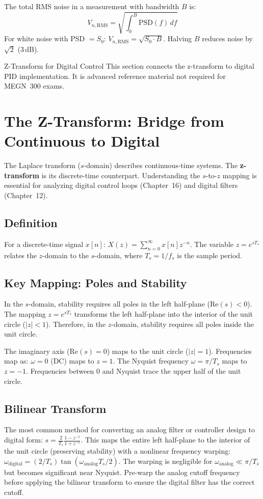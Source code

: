 \documentclass[11pt,letterpaper,twoside,openany]{book}
\begin{document}
The total RMS noise in a measurement with bandwidth $B$ is:
\begin{equation}
V_{n,\text{RMS}} = \sqrt{\int_0^B \text{PSD}(f)\,df}
\end{equation}
For white noise with PSD $= S_0$: $V_{n,\text{RMS}} = \sqrt{S_0 \cdot B}$. Halving $B$ reduces noise by $\sqrt{2}$ (3\,dB).
\begin{advancedbox}{Z-Transform for Digital Control}
This section connects the z-transform to digital PID implementation. It is advanced reference material not required for MEGN~300 exams.
\end{advancedbox}
\section{The Z-Transform: Bridge from Continuous to Digital}
The Laplace transform ($s$-domain) describes continuous-time systems. The \textbf{z-transform} is its discrete-time counterpart. Understanding the $s$-to-$z$ mapping is essential for analyzing digital control loops (Chapter~16) and digital filters (Chapter~12).

\subsection{Definition}
For a discrete-time signal $x[n]$: $X(z) = \sum_{n=0}^{\infty} x[n] z^{-n}$. The variable $z = e^{sT_s}$ relates the $z$-domain to the $s$-domain, where $T_s = 1/f_s$ is the sample period.

\subsection{Key Mapping: Poles and Stability}
In the $s$-domain, stability requires all poles in the left half-plane ($\text{Re}(s) < 0$). The mapping $z = e^{sT_s}$ transforms the left half-plane into the interior of the unit circle ($|z| < 1$). Therefore, in the $z$-domain, stability requires all poles inside the unit circle.

The imaginary axis ($\text{Re}(s) = 0$) maps to the unit circle ($|z| = 1$). Frequencies map as: $\omega = 0$ (DC) maps to $z = 1$. The Nyquist frequency $\omega = \pi/T_s$ maps to $z = -1$. Frequencies between 0 and Nyquist trace the upper half of the unit circle.

\subsection{Bilinear Transform}
The most common method for converting an analog filter or controller design to digital form: $s = \frac{2}{T_s} \frac{1 - z^{-1}}{1 + z^{-1}}$. This maps the entire left half-plane to the interior of the unit circle (preserving stability) with a nonlinear frequency warping: $\omega_{\text{digital}} = (2/T_s)\tan(\omega_{\text{analog}} T_s/2)$. The warping is negligible for $\omega_{\text{analog}} \ll \pi/T_s$ but becomes significant near Nyquist. Pre-warp the analog cutoff frequency before applying the bilinear transform to ensure the digital filter has the correct cutoff.
\end{document}
